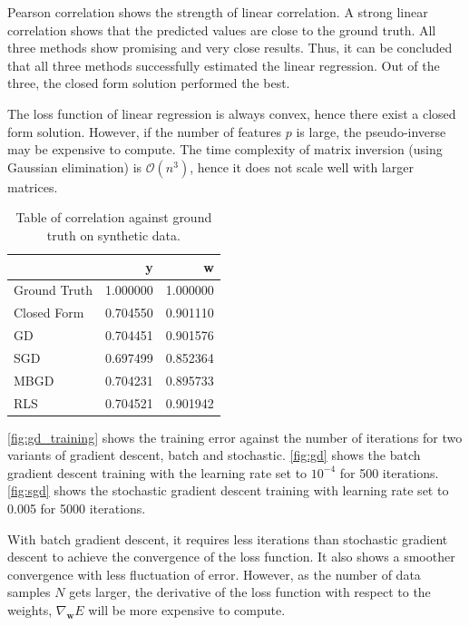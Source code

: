 \documentclass{article}
\begin{document}
Pearson correlation shows the strength of linear correlation. A strong linear correlation shows that the predicted values are close to the ground truth. All three methods show promising and very close results. Thus, it can be concluded that all three methods successfully estimated the linear regression. Out of the three, the closed form solution performed the best.

The loss function of linear regression is always convex, hence there exist a closed form solution. However, if the number of features $p$ is large, the pseudo-inverse may be expensive to compute. The time complexity of matrix inversion (using Gaussian elimination) is $\mathcal{O}(n^3)$, hence it does not scale well with larger matrices.

\begin{table}[h!]
    \centering
    \caption{Table of correlation against ground truth on synthetic data.}
    \label{tab:task1_corr}
    \begin{tabular}{lrr}
    \toprule
    {} &         y &         w \\
    \midrule
    Ground Truth &  1.000000 &  1.000000 \\
    Closed Form  &  0.704550 &  0.901110 \\
    GD           &  0.704451 &  0.901576 \\
    SGD          &  0.697499 &  0.852364 \\
    MBGD         &  0.704231 &  0.895733 \\
    RLS          &  0.704521 &  0.901942 \\
    \bottomrule
    \end{tabular}
    
\end{table}
    
    
    

\cref{fig:gd_training} shows the training error against the number of iterations for two variants of gradient descent, batch and stochastic. \cref{fig:gd} shows the batch gradient descent training with the learning rate set to $10^{-4}$ for 500 iterations. \cref{fig:sgd} shows the stochastic gradient descent training with learning rate set to 0.005 for 5000 iterations.

With batch gradient descent, it requires less iterations than stochastic gradient descent to achieve the convergence of the loss function. It also shows a smoother convergence with less fluctuation of error. However, as the number of data samples $N$ gets larger, the derivative of the loss function with respect to the weights, $\nabla_{\boldsymbol{w}} E$ will be more expensive to compute.
\end{document}
